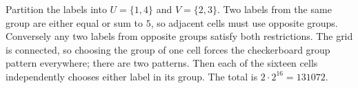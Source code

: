 Partition the labels into $U=\{1,4\}$ and $V=\{2,3\}$. Two labels from the same group are either equal or sum to $5$, so adjacent cells must use opposite groups. Conversely any two labels from opposite groups satisfy both restrictions. The grid is connected, so choosing the group of one cell forces the checkerboard group pattern everywhere; there are two patterns. Then each of the sixteen cells independently chooses either label in its group. The total is $2\cdot2^{16}=\boxed{131072}$.
